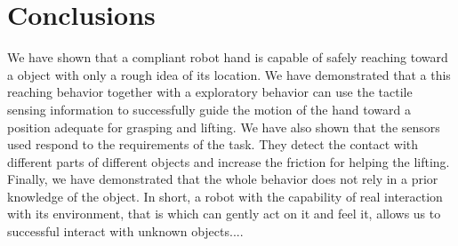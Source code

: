 
\section{Conclusions}
\label{sec:conclusions}


We have shown that a compliant robot hand is capable of safely
reaching toward a object with only a rough idea of its location.
We have demonstrated that a this reaching behavior together with a
exploratory behavior can use the tactile sensing information to
successfully guide the motion of the hand toward a position
adequate for grasping and lifting. We have also shown that the
sensors used respond to the requirements of the task. They detect
the contact with different parts of different objects and increase
the friction for helping the lifting. Finally, we have
demonstrated that the whole behavior does not rely in a prior
knowledge of the object. In short, a robot with the capability of
real interaction with its environment, that is which can gently
act on it and feel it, allows us to successful interact with
unknown objects....



